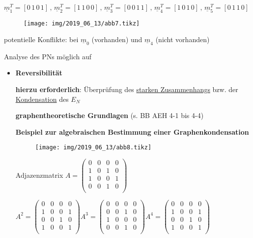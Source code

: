 \begin{itemize}
	$\underline{m}_1^{T} = [0\, 1\, 0\,  1] \, , \, \underline{m}_2^{T} = [1\, 1\, 0\,  0] \, , \,\underline{m}_3^{T} = [0\, 0\, 1\,  1] \, , \, \underline{m}_4^{T} = [1\, 0\, 1\,  0] \, , \, \underline{m}_5^{T} = [0\, 1\, 1\,  0] $
	\begin{figure}[H]
		\centering
		\texttt{[image: img/2019\_06\_13/abb7.tikz]}
	\end{figure}
	
	potentielle Konflikte: bei $\underline{m}_0$ (vorhanden) und $\underline{m}_4$ (nicht vorhanden)
\end{itemize}


Analyse des PNs möglich auf
\begin{itemize}
	\item{\textbf{Reversibilität}}  
	
	\textbf{hierzu erforderlich}: Überprüfung des \underline{starken Zusammenhangs} bzw. der \underline{Kondensation} des $E_N$
	
	\textbf{graphentheoretische Grundlagen} (s. BB AEH 4-1 bis 4-4)
	
	\textbf{Beispiel zur algebraischen Bestimmung einer Graphenkondensation}
	\begin{figure}[H]
		\centering
		\texttt{[image: img/2019\_06\_13/abb8.tikz]}
	\end{figure}
	
	Adjazenzmatrix $A = \left( \begin{array}{rrrr}
	0 & 0 & 0 & 0 \\
	1 & 0 & 1 & 0 \\
	1 & 0 & 0 & 1 \\
	0 & 0 & 1 & 0 \\
	\end{array}\right)$
	
	$
	A^{2} = \left( \begin{array}{rrrr}
	0 & 0 & 0 & 0 \\
	1 & 0 & 0 & 1 \\
	0 & 0 & 1 & 0 \\
	1 & 0 & 0 & 1 \\
	\end{array}\right)
	A^{3} = \left( \begin{array}{rrrr}
	0 & 0 & 0 & 0 \\
	0 & 0 & 1 & 0 \\
	1 & 0 & 0 & 0 \\
	0 & 0 & 1 & 0 \\
	\end{array}\right)
	A^{4} = \left( \begin{array}{rrrr}
	0 & 0 & 0 & 0 \\
	1 & 0 & 0 & 1 \\
	0 & 0 & 1 & 0 \\
	1 & 0 & 0 & 1 \\
	\end{array}\right)	
	 $


\end{itemize}
